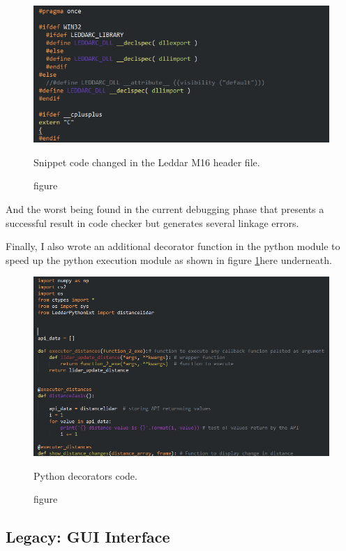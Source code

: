 \documentclass[onecolumn, draftclsnofoot,10pt, compsoc]{IEEEtran}
\begin{document}
\begin{singlespace}
 \begin{figure}[H]
 \centering
			\includegraphics[scale=0.5]{images/change-M16.PNG}
			\caption{figure}{Snippet code changed in the Leddar M16 header file.}
			\label{change-M16}
		\end{figure}

And the worst being found in the current debugging phase that presents a successful result in code checker but generates several linkage errors.  

Finally, I also wrote an additional decorator function in the python module to speed up the python execution module as shown in figure \ref{change-M16}here underneath.

 \begin{figure}[H]
 \centering
			\includegraphics[scale=0.5]{images/python-code.PNG}
			\caption{figure}{Python decorators code.}
			\label{python-code}
		\end{figure}
		
		
\subsection{ Legacy: GUI Interface}


\end{singlespace}
\end{document}
